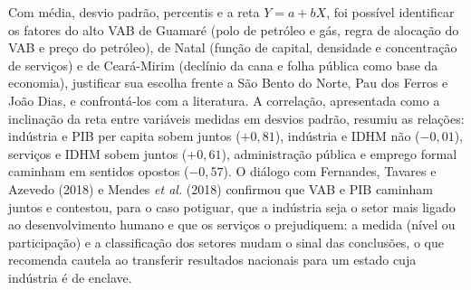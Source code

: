 \documentclass[12pt,a4paper]{article}
\begin{document}
Com média, desvio padrão, percentis e a reta $Y = a + bX$, foi possível identificar os fatores do alto VAB de Guamaré (polo de petróleo e gás, regra de alocação do VAB e preço do petróleo), de Natal (função de capital, densidade e concentração de serviços) e de Ceará-Mirim (declínio da cana e folha pública como base da economia), justificar sua escolha frente a São Bento do Norte, Pau dos Ferros e João Dias, e confrontá-los com a literatura. A correlação, apresentada como a inclinação da reta entre variáveis medidas em desvios padrão, resumiu as relações: indústria e PIB per capita sobem juntos ($+0{,}81$), indústria e IDHM não ($-0{,}01$), serviços e IDHM sobem juntos ($+0{,}61$), administração pública e emprego formal caminham em sentidos opostos ($-0{,}57$). O diálogo com Fernandes, Tavares e Azevedo (2018) e Mendes \textit{et al.} (2018) confirmou que VAB e PIB caminham juntos e contestou, para o caso potiguar, que a indústria seja o setor mais ligado ao desenvolvimento humano e que os serviços o prejudiquem: a medida (nível ou participação) e a classificação dos setores mudam o sinal das conclusões, o que recomenda cautela ao transferir resultados nacionais para um estado cuja indústria é de enclave.
\end{document}
